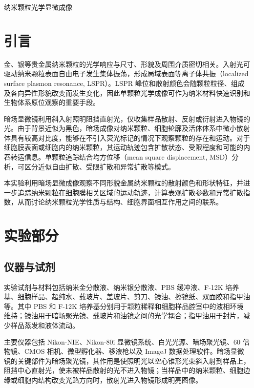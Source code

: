 \documentclass[a4paper]{article}
\newcommand{\zihaoSan}{\fontsize{16pt}{24pt}\selectfont}
\newcommand{\zihaoWu}{\fontsize{10.5pt}{16pt}\selectfont}
\begin{document}
\zihaoWu

\begin{center}
  {\zihaoSan\heiti 纳米颗粒光学显微成像}
\end{center}

\vspace{6pt}

\section{引言}
\vspace{-0.5em}

金、银等贵金属纳米颗粒的光学响应与尺寸、形貌及周围介质密切相关。入射光可驱动纳米颗粒表面自由电子发生集体振荡，形成局域表面等离子体共振（localized surface plasmon resonance, LSPR）。LSPR 峰位和散射颜色会随颗粒粒径、组成及各向异性形貌改变而发生变化，因此单颗粒光学成像可作为纳米材料快速识别和生物体系原位观察的重要手段\cite{eustis2006,murphy2005}。

暗场显微镜利用斜入射照明阻挡直射光，仅收集样品散射、反射或衍射进入物镜的光。由于背景近似为黑色，暗场成像对纳米颗粒、细胞轮廓及活体体系中微小散射体具有较高对比度，能够在不引入荧光标记的情况下观察颗粒的存在和运动。对于细胞膜表面或细胞内的纳米颗粒，其运动轨迹包含扩散状态、受限程度和可能的内吞转运信息。单颗粒追踪结合均方位移（mean square displacement, MSD）分析，可区分近似自由扩散、受限扩散和异常扩散等模式\cite{kusumi1993,kowalek2019}。

本实验利用暗场显微成像观察不同形貌金属纳米颗粒的散射颜色和形状特征，并进一步追踪纳米颗粒在细胞膜相关区域的运动轨迹，计算表观扩散参数和异常扩散指数，从而讨论纳米颗粒光学性质与结构、细胞界面相互作用之间的联系。


\section{实验部分}
\vspace{-0.5em}

\subsection{仪器与试剂}

实验试剂与材料包括纳米金分散液、纳米银分散液、PBS 缓冲液、F-12K 培养基、细胞样品、超纯水、载玻片、盖玻片、剪刀、镜油、擦镜纸、双面胶和指甲油等。其中 PBS 和 F-12K 培养基分别用于颗粒稀释和细胞样品腔室中的液相环境维持；镜油用于暗场聚光镜、载玻片和油镜之间的光学耦合；指甲油用于封片，减少样品蒸发和液体流动。

主要仪器包括 Nikon-NIE、Nikon-80i 显微镜系统、白光光源、暗场聚光镜、60 倍物镜、CMOS 相机、微型孵化器、移液枪以及 ImageJ 数据处理软件。暗场显微镜的关键部件为暗场聚光镜，其作用是使照明光以空心锥形光束斜入射到样品上，阻挡中心直射光，使未被样品散射的光不进入物镜；当样品中的纳米颗粒、细胞边缘或细胞内结构改变光路方向时，散射光进入物镜形成明亮图像。
\end{document}
